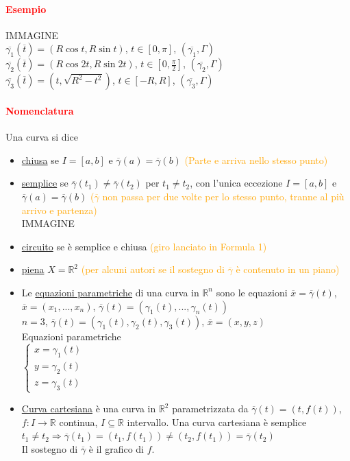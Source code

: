 \documentclass{article}
\newcommand{\R}{\mathbb{R}}
\begin{document}
\paragraph{\textcolor{red}{Esempio}}
IMMAGINE\\
$\overline{\gamma_1}(\overline{t})=(R\cos t , R\sin t)$, $t \in [0,\pi]$, $(\overline{\gamma_1},\Gamma)$\\
$\overline{\gamma_2}(\overline{t})=(R\cos 2t, R\sin 2t)$, $t \in [0,\frac{\pi}{2}]$, $(\overline{\gamma_2},\Gamma)$\\
$\overline{\gamma_3}(\overline{t})=(t, \sqrt{R^2-t^2})$, $t \in [-R,R]$, $(\overline{\gamma_3},\Gamma)$

\paragraph{\textcolor{red}{Nomenclatura}}
Una curva si dice
\begin{itemize}
    \item \underline{chiusa} se $I = [a,b]$ e $\overline{\gamma}(a)=\overline{\gamma}(b)$ \textcolor{orange}{(Parte e arriva nello stesso punto)}
    \item \underline{semplice} se $\overline{\gamma}(t_1)\neq \overline{\gamma}(t_2)$ per $t_1 \neq t_2$, con l'unica eccezione $I =[a,b]$ e $\overline{\gamma}(a)=\overline{\gamma}(b)$ \textcolor{orange}{($\overline{\gamma}$ non passa per due volte per lo stesso punto, tranne al più arrivo e partenza)}\\
    IMMAGINE
    \item \underline{circuito} se è semplice e chiusa \textcolor{orange}{(giro lanciato in Formula 1)}
    \item \underline{piena} $X =\R^2$ \textcolor{orange}{(per alcuni autori se il sostegno di $\overline{\gamma}$ è contenuto in un piano)}
\end{itemize}
\begin{itemize}
    \item Le \underline{equazioni parametriche} di una curva in $\R^n$ sono le equazioni $\overline{x}=\overline{\gamma}(t)$, $\overline{x}=(x_1,...,x_n)$, $\overline{\gamma}(t)=(\gamma_1(t),...,\gamma_n(t))$\\
$n=3$, $\overline{\gamma}(t)=(\gamma_1(t),\gamma_2(t),\gamma_3 (t))$, $\overline{x}=(x,y,z)$\\
Equazioni parametriche\\
$\begin{cases}
    x=\gamma_1(t)\\
    y=\gamma_2(t)\\
    z=\gamma_3(t)
\end{cases}$
\item \underline{Curva cartesiana} è una curva in $\R^2$ parametrizzata da $\overline{\gamma}(t)=(t,f(t))$, $f:I \rightarrow \R$ continua, $I \subseteq \R$ intervallo. Una curva cartesiana è semplice\\
$t_1 \neq t_2 \Rightarrow \overline{\gamma}(t_1)=(t_1,f(t_1))\neq (t_2,f(t_1))=\overline{\gamma}(t_2)$\\
Il sostegno di $\overline{\gamma}$ è il grafico di $f$.
 \end{itemize}
\end{document}
